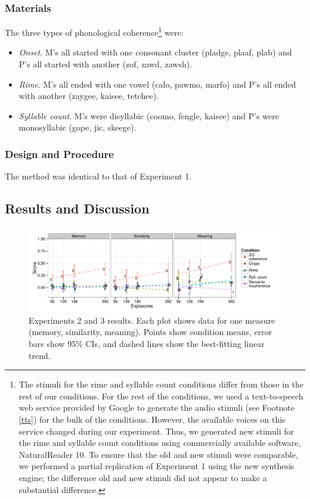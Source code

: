 \documentclass[man,floatsintext]{apa6}
\begin{document}
\subsubsection{Materials}
The three types of phonological coherence\footnote{\label{change-of-stimuli} The stimuli for the rime and syllable count conditions differ from those in the rest of our conditions. For the rest of the conditions, we used a text-to-speech web service provided by Google to generate the audio stimuli (see Footnote \ref{tts}) for the bulk of the conditions. However, the available voices on this service changed during our experiment. Thus, we generated new stimuli for the rime and syllable count conditions using commercially available software, NaturalReader 10. To ensure that the old and new stimuli were comparable, we performed a partial replication of Experiment 1 using the new synthesis engine; the difference old and new stimuli did not appear to make a substantial difference.} were:
\begin{itemize}
\item \emph{Onset}. M's all started with one consonant cluster (pladge, plaaf, plab) and P's all started with another (zof, zawd, zawsh).
\item \emph{Rime}. M's all ended with one vowel (calo, pawmo, marfo) and P's all ended with another (zaygee, kaisee, tetchee).
\item \emph{Syllable count}. M's were disyllabic (coomo, fengle, kaisee) and P's were monosyllabic (gope, jic, skeege).
\end{itemize} 

\subsubsection{Design and Procedure} The method was identical to that of Experiment 1.

\subsection{Results and Discussion}

\begin{figure}[t]
  \begin{center}
    \includegraphics[width=1.0\linewidth]{x23.pdf}
    \caption{Experiments 2 and 3 results. Each plot shows data for one measure (memory, similarity, meaning). Points show condition means, error bars show 95\% CIs, and dashed lines show the best-fitting linear trend.}
    \label{expt23-results}
  \end{center}
\end{figure}
\end{document}
